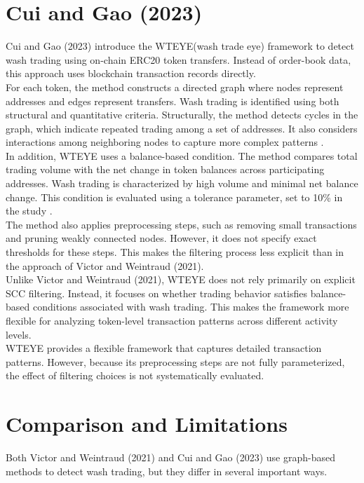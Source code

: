 \documentclass[language=english,thesis=bachelor,nosecondtitle,faculty=cb,onesided,13pt]{hsmw-thesis}
\begin{document}
	\section{Cui and Gao (2023)}
Cui and Gao (2023) introduce the WTEYE(wash trade eye) framework to detect wash trading using on-chain ERC20 token transfers. Instead of order-book data, this approach uses blockchain transaction records directly.\\
For each token, the method constructs a directed graph where nodes represent addresses and edges represent transfers. Wash trading is identified using both structural and quantitative criteria. Structurally, the method detects cycles in the graph, which indicate repeated trading among a set of addresses. It also considers interactions among neighboring nodes to capture more complex patterns \cite{cui2023chain}.\\
In addition, WTEYE uses a balance-based condition. The method compares total trading volume with the net change in token balances across participating addresses. Wash trading is characterized by high volume and minimal net balance change. This condition is evaluated using a tolerance parameter, set to 10\% in the study \cite{cui2023chain}.\\
The method also applies preprocessing steps, such as removing small transactions and pruning weakly connected nodes. However, it does not specify exact thresholds for these steps. This makes the filtering process less explicit than in the approach of Victor and Weintraud (2021).\\
Unlike Victor and Weintraud (2021), WTEYE does not rely primarily on explicit SCC filtering. Instead, it focuses on whether trading behavior satisfies balance-based conditions associated with wash trading. This makes the framework more flexible for analyzing token-level transaction patterns across different activity levels.\\
WTEYE provides a flexible framework that captures detailed transaction patterns. However, because its preprocessing steps are not fully parameterized, the effect of filtering choices is not systematically evaluated.

	\section{Comparison and Limitations}
Both Victor and Weintraud (2021) and Cui and Gao (2023) use graph-based methods to detect wash trading, but they differ in several important ways.
\end{document}
